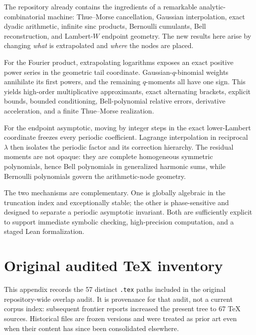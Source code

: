 \documentclass[11pt]{article}
\theoremstyle{definition}
\theoremstyle{remark}
\begin{document}
The repository already contains the ingredients of a remarkable analytic-combinatorial machine: Thue--Morse cancellation, Gaussian interpolation, exact dyadic arithmetic, infinite sinc products, Bernoulli cumulants, Bell reconstruction, and Lambert-$W$ endpoint geometry. The new results here arise by changing \emph{what} is extrapolated and \emph{where} the nodes are placed.

For the Fourier product, extrapolating logarithms exposes an exact positive power series in the geometric tail coordinate. Gaussian-$q$-binomial weights annihilate its first powers, and the remaining $q$-moments all have one sign. This yields high-order multiplicative approximants, exact alternating brackets, explicit bounds, bounded conditioning, Bell-polynomial relative errors, derivative acceleration, and a finite Thue--Morse realization.

For the endpoint asymptotic, moving by integer steps in the exact lower-Lambert coordinate freezes every periodic coefficient. Lagrange interpolation in reciprocal $\lambda$ then isolates the periodic factor and its correction hierarchy. The residual moments are not opaque: they are complete homogeneous symmetric polynomials, hence Bell polynomials in generalized harmonic sums, while Bernoulli polynomials govern the arithmetic-node geometry.

The two mechanisms are complementary. One is globally algebraic in the truncation index and exceptionally stable; the other is phase-sensitive and designed to separate a periodic asymptotic invariant. Both are sufficiently explicit to support immediate symbolic checking, high-precision computation, and a staged Lean formalization.

\appendix

\section{Original audited TeX inventory}
\label{app:inventory}

This appendix records the 57 distinct \texttt{.tex} paths included in the original
repository-wide overlap audit.  It is provenance for that audit, not a current corpus
index: subsequent frontier reports increased the present tree to 67 TeX sources.
Historical files are frozen versions and were treated as prior art even when their content
has since been consolidated elsewhere.
\end{document}
